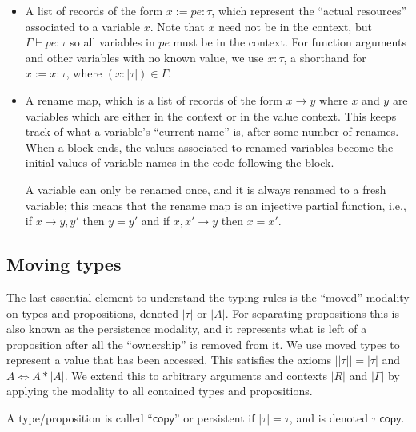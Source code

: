 \documentclass[acmsmall,nonacm]{acmart}
\newcommand{\core}[1]{\left| #1 \right|}
\newcommand{\proves}{\vdash}
\begin{document}
\begin{itemize}
\item A list of records of the form $x:=pe:\tau$, which represent the ``actual resources'' associated to a variable $x$. Note that $x$ need not be in the context, but $\Gamma\proves pe:\tau$ so all variables in $pe$ must be in the context. For function arguments and other variables with no known value, we use $x:\tau$, a shorthand for $x:=x:\tau$, where $(x:\core\tau)\in\Gamma$.
\item A rename map, which is a list of records of the form $x\to y$ where $x$ and $y$ are variables which are either in the context or in the value context. This keeps track of what a variable's ``current name'' is, after some number of renames. When a block ends, the values associated to renamed variables become the initial values of variable names in the code following the block.

A variable can only be renamed once, and it is always renamed to a fresh variable; this means that the rename map is an injective partial function, i.e., if $x\to y,y'$ then $y=y'$ and if $x,x'\to y$ then $x=x'$.
\end{itemize}

\subsection{Moving types}\label{sec:moving}

The last essential element to understand the typing rules is the ``moved'' modality on types and propositions, denoted $\core\tau$ or $\core A$. For separating propositions this is also known as the persistence modality, and it represents what is left of a proposition after all the ``ownership'' is removed from it. We use moved types to represent a value that has been accessed. This satisfies the axioms $\core{\core\tau}=\core\tau$ and $A\Leftrightarrow A\ast\core A$. We extend this to arbitrary arguments and contexts $\core R$ and $\core\Gamma$ by applying the modality to all contained types and propositions.

A type/proposition is called ``$\mathsf{copy}$'' or persistent if $\core\tau=\tau$, and is denoted $\tau\;\mathsf{copy}$.
\end{document}
